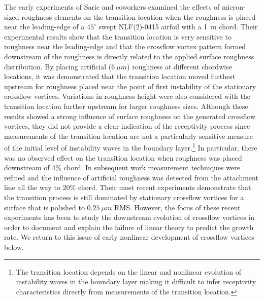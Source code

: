 %
%
The early experiments of Saric and coworkers \cite{RaReSa:93} examined the
effects of micron-sized roughness elements on the transition location when the
roughness is placed near the leading-edge of a $45^\circ$ swept NLF(2)-0415
airfoil with a 1~m chord.  Their experimental results show that the transition
location is very sensitive to roughness near the leading-edge and that the
crossflow vortex pattern formed downstream of the roughness is directly
related to the applied surface roughness distribution.  By placing artificial
($6~\mu m$) roughness at different chordwise locations, it was demonstrated
that the transition location moved furthest upstream for roughness placed near
the point of first instability of the stationary crossflow vortices.
Variations in roughness height were also considered with the transition
location further upstream for larger roughness sizes.  Although these results
showed a strong influence of surface roughness on the generated crossflow
vortices, they did not provide a clear indication of the receptivity process
since measurements of the transition location are not a particularly sensitive
measure of the initial level of instability waves in the boundary
layer.\footnote{The transition location depends on the linear and nonlinear
evolution of instability waves in the boundary layer making it difficult to
infer receptivity characteristics directly from measurements of the transition
location.}  In particular, there was no observed effect on the transition
location when roughness was placed downstream of 4\% chord.  In subsequent
work \cite{RaReSa:94} measurement techniques were refined and the influence of
artificial roughness was detected from the attachment line all the way to 20\%
chord.  Their most recent experiments \cite{ReSaCaCh:96} demonstrate that the
transition process is still dominated by stationary crossflow vortices for a
surface that is polished to $0.25~\mu m$ RMS.  However, the focus of these
recent experiments has been to study the downstream evolution of crossflow
vortices in order to document and explain the failure of linear theory to
predict the growth rate.  We return to this issue of early nonlinear
development of crossflow vortices below.

